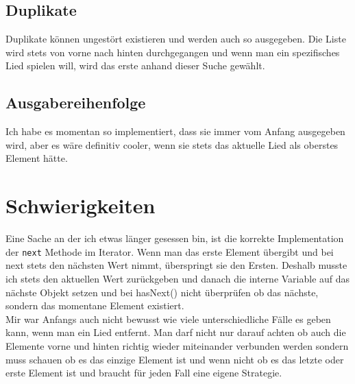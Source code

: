 \documentclass{article}
\begin{document}
	\subsection*{Duplikate}
	Duplikate können ungestört existieren und werden auch so ausgegeben.
	Die Liste wird stets von vorne nach hinten durchgegangen und wenn man ein spezifisches Lied spielen will, wird das erste anhand dieser Suche gewählt. \\
	\subsection*{Ausgabereihenfolge}
	Ich habe es momentan so implementiert, dass sie immer vom Anfang ausgegeben wird, aber es wäre definitiv cooler, wenn sie stets das aktuelle Lied als oberstes Element hätte.
	\section*{Schwierigkeiten}
	Eine Sache an der ich etwas länger gesessen bin, ist die korrekte Implementation der \texttt{next} Methode im Iterator. Wenn man das erste Element übergibt und bei next stets den nächsten Wert nimmt, überspringt sie den Ersten. Deshalb musste ich stets den aktuellen Wert zurückgeben und danach die interne Variable auf das nächste Objekt setzen und bei hasNext() nicht überprüfen ob das nächste, sondern das momentane Element existiert. \\
	Mir war Anfangs auch nicht bewusst wie viele unterschiedliche Fälle es geben kann, wenn man ein Lied entfernt. Man darf nicht nur darauf achten ob auch die Elemente vorne und hinten richtig wieder miteinander verbunden werden sondern muss schauen ob es das einzige Element ist und wenn nicht ob es das letzte oder erste Element ist und braucht für jeden Fall eine eigene Strategie.
	























  
\end{document}

